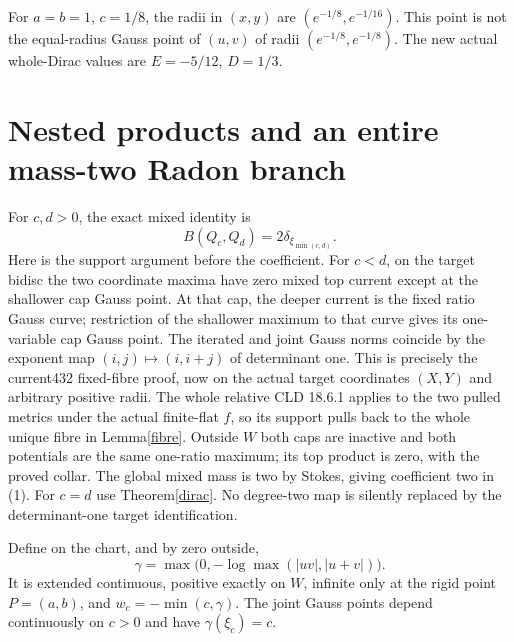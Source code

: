 \documentclass[11pt]{article}
\begin{document}
For $a=b=1$, $c=1/8$, the radii in $(x,y)$ are
$(e^{-1/8},e^{-1/16})$. This point is not the equal-radius Gauss
point of $(u,v)$ of radii $(e^{-1/8},e^{-1/8})$.
The new actual whole-Dirac values are $E=-5/12$, $D=1/3$.

\section{Nested products and an entire mass-two Radon branch}
For $c,d>0$, the exact mixed identity is
\[
 B(Q_c,Q_d)=2\delta_{\xi_{\min(c,d)}}.                 \tag{1}
\]
Here is the support argument before the coefficient. For $c<d$,
on the target bidisc the two coordinate maxima have zero mixed
top current except at the shallower cap Gauss point. At that cap,
the deeper current is the fixed ratio Gauss curve; restriction
of the shallower maximum to that curve gives its one-variable
cap Gauss point. The iterated and joint Gauss norms coincide
by the exponent map $(i,j)\mapsto(i,i+j)$ of determinant one.
This is precisely the current432 fixed-fibre proof, now on the
actual target coordinates $(X,Y)$ and arbitrary positive radii.
The whole relative CLD 18.6.1 applies to the two pulled metrics
under the actual finite-flat $f$, so its support pulls back to
the whole unique fibre in Lemma\ref{fibre}. Outside $W$ both
caps are inactive and both potentials are the same one-ratio
maximum; its top product is zero, with the proved collar.
The global mixed mass is two by Stokes, giving coefficient two
in (1). For $c=d$ use Theorem\ref{dirac}. No degree-two map
is silently replaced by the determinant-one target identification.

Define on the chart, and by zero outside,
\[
 \gamma=\max\big(0,-\log\max(|uv|,|u+v|)\big).
\]
It is extended continuous, positive exactly on $W$, infinite
only at the rigid point $P=(a,b)$, and $w_c=-\min(c,\gamma)$.
The joint Gauss points depend continuously on $c>0$ and have
$\gamma(\xi_c)=c$.
\end{document}
